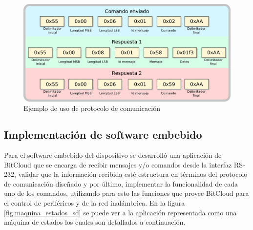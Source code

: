  
\begin{figure}
	\centering
	\includegraphics[scale=0.4]{capitulo_3_imgs/protocolo_ejemplo_1.pdf}
	\caption{Ejemplo de uso de protocolo de comunicación}
	\label{fig:protocolo_ejemplo}
\end{figure}

\subsection{Implementación de software embebido}


Para el software embebido del dispositivo se desarrolló una aplicación de BitCloud que se encarga de recibir mensajes y/o comandos desde la interfaz RS-232, validar que la información recibida esté estructura en términos del protocolo de comunicación diseñado y por último, implementar la funcionalidad de cada uno de los comandos, utilizando para esto las funciones que provee BitCloud para el control de periféricos y de la red inalámbrica. En la figura \ref{fig:maquina_estados_sd} se puede ver a la aplicación representada como una máquina de estados los cuales son detallados a continuación. 

